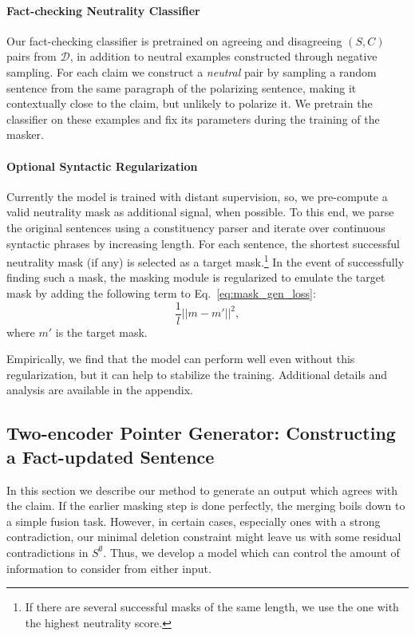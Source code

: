 \documentclass[letterpaper]{article}
\renewcommand{\eqref}[1]{Eq.~\ref{#1}}
\begin{document}
\paragraph{Fact-checking Neutrality Classifier} \label{sec:neutral_classifier}
 Our fact-checking classifier is pretrained on agreeing and disagreeing $(S,C)$ pairs from $\mathcal{D}$, in addition to neutral examples constructed through negative sampling. For each claim we construct a \textit{neutral} pair by sampling a random sentence from the same paragraph of the polarizing sentence, making it contextually close to the claim, but unlikely to polarize it. We pretrain the classifier on these examples and fix its parameters during the training of the masker.



\paragraph{Optional Syntactic Regularization}


Currently the model is trained with distant supervision, so, we pre-compute a valid neutrality mask as additional signal, when possible. To this end, we parse the original sentences using a constituency parser and iterate over continuous syntactic phrases by increasing length. For each sentence, the shortest successful neutrality mask (if any) is selected as a target mask.\footnote{If there are several successful masks of the same length, we use the one with the highest neutrality score.} In the event of successfully finding such a mask, the masking module is regularized to emulate the target mask by adding the following term to \eqref{eq:mask_gen_loss}:
\begin{equation}
    \frac{1}{l} || m - m' ||^2,
    \label{eq:boots}
\end{equation}
where $m'$ is the target mask.

Empirically, we find that the model can perform well even without this regularization, but it can help to stabilize the training. Additional details and analysis are available in the appendix.

\subsection{Two-encoder Pointer Generator: Constructing a Fact-updated Sentence} \label{sec:pointer_gen}
In this section we describe our method to generate an output which agrees with the claim. If the earlier masking step is done perfectly, the merging boils down to a simple fusion task. However, in certain cases, especially ones with a strong contradiction, our minimal deletion constraint might leave us with some residual contradictions in $S^{\emptyset}$. Thus, we develop a model which can control the amount of information to consider from either input.
\end{document}
